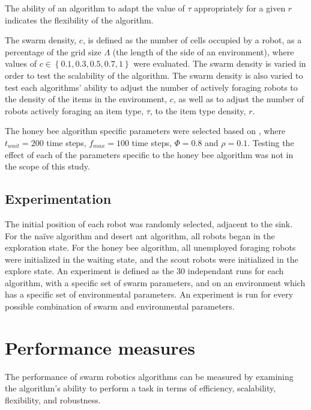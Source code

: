 \documentclass[preprint,12pt]{elsarticle}
\begin{document}
The ability of an algorithm to adapt the value of $\tau$ appropriately for a given $r$ indicates the flexibility of the algorithm.

The swarm density, $c$, is defined as the number of cells occupied by a robot, as a percentage of the grid size $\Lambda$ (the length of the side of an environment), where values of $c\in\left\{0.1, 0.3, 0.5, 0.7, 1\right\}$ were evaluated. The swarm density is varied in order to test the scalability of the algorithm. The swarm density is also varied to test each algorithms' ability to adjust the number of actively foraging robots to the density of the items in the environment, $c$, as well as to adjust the number of robots actively foraging an item type, $\tau$, to the item type density, $r$.

The honey bee algorithm specific parameters were selected based on \cite{seeley2009wisdom}, where $t_{wait}=200$ time steps, $f_{max}=100$ time steps, $\Phi=0.8$ and $\rho=0.1$. Testing the effect of each of the parameters specific to the honey bee algorithm was not in the scope of this study.

\subsection{Experimentation}
\label{experimentation}

The initial position of each robot was randomly selected, adjacent to the sink. For the na\"ive algorithm and desert ant algorithm, all robots began in the exploration state. For the honey bee algorithm, all unemployed foraging robots were initialized in the waiting state, and the scout robots were initialized in the explore state. 
An experiment is defined as the 30 independant runs for each algorithm, with a specific set of swarm parameters, and on an environment which has a specific set of environmental parameters. An experiment is run for every possible combination of swarm and environmental parameters.

\section{Performance measures}
\label{thri:third:performancemeasures}

The performance of swarm robotics algorithms can be measured by examining the algorithm's ability to perform a task in terms of efficiency, scalability, flexibility, and robustness.
\end{document}
